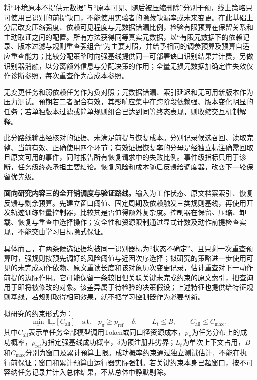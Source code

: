 将“环境原本不提供元数据”与“原本可见、随后被压缩删除”分别干预，线上策略只可使用已识别的前提缺口，不能使用实验者的隐藏缺漏率或未来变更。在此基础上分层改变压缩强度、依赖可见程度与元数据错漏比例，检验有限预算在保留关系和主动取证之间的配置。所有方法获得同等真实元数据，以“有限元数据下的依赖记录、版本过滤与规则重查强组合”为主要对照，并给予相同的调参预算及预算自适应重查能力；比较分配策略时向强基线提供同一可部署缺口识别结果并计费，另做识别器消融，以分离额外信息与分配决策的作用；全量无损元数据加确定性失效仅作诊断参照，每次重查作为高成本参照。

无变更任务和弱依赖任务作为负对照；元数据错漏、索引延迟和无可用新版本作为压力测试。预期若二者配合有效，其影响应集中在跨阶段依赖强、版本变化明显的任务；若单独版本过滤或简单规则组合已达到同等终态表现，则收缩交互机制解释。

此分路线输出经核对的证据、未满足前提与恢复成本。分别记录候选召回、读取完整、当前有效、正确使用四个环节；有效证据恢复率的分母是经独立标注确需回取且原文可用的事件，同时报告所有恢复请求中的失败比例。事件级指标只用于诊断，任务级终态承担主要结论。恢复风险和成本随后反馈给调度器，改变下一轮保留优先级。

\textbf{面向研究内容三的全开销调度与验证路线。}输入为工作状态、原文档案索引、恢复反馈与剩余预算。先建立窗口阈值、固定周期及依赖触发三类规则基线，再使用开发轨迹训练轻量控制器，比较其是否值得额外复杂度。控制器在保留、压缩、卸载、恢复与重查中选择操作；安全性和资源限制通过显式计数及动作前提检查实现，不能交由学习目标隐式保证。

具体而言，在两条候选证据均被同一识别器标为“状态不确定”、且只剩一次重查预算时，强规则按预先调好的风险阈值与近因次序选择；拟研究的策略进一步使用可见的未完成动作依赖、原文重读长度和该对象历次变更记录，估计重查对下一动作前提的边际作用。它可能保留一条较旧但关联关键未完成约束的原文索引，把查询用于即将被修改的对象。该差异属于待检验的决策假设；上述特征也提供给特征规则基线，若规则取得相同效果，就不把学习控制器作为必要创新。

拟研究的约束形式为：
\[
\min_{\pi}\;\mathbb{E}_{\pi}[C_{\mathrm{all}}]\quad
\text{s.t.}\quad
p_{\pi}\ge p_{\mathrm{ref}}-\delta,\qquad
L_t\le B,\qquad C_{\mathrm{all}}\le C_{\max}.
\]
其中\(C_{\mathrm{all}}\)表示单任务全部模型调用Token或同口径资源成本，\(p_{\pi}\)为任务分布上的成功概率，\(p_{\mathrm{ref}}\)为指定强基线成功概率，\(\delta\)为预注册非劣界；\(L_t\)为单次上下文占用，\(B\)和\(C_{\max}\)分别为窗口及累计预算上限。成功概率约束通过独立测试估计，不能在执行前保证；窗口和累计预算由运行器实际强制。若关键约束本身已超窗口，按不可容纳任务记录并计入总体结果，不从总体中静默剔除。

